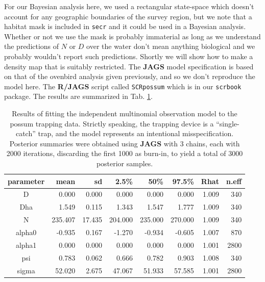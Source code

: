 For our Bayesian analysis here, we used a rectangular state-space which
doesn't account for any geographic boundaries of the survey region, but
we note that a habitat mask is included in {\tt secr} and it could be
used in a Bayesian analysis.
Whether or not we use the mask is
probably immaterial as long as we understand the predictions of $N$ or
$D$ over the water don't mean anything biological and we probably
wouldn't report such predictions. Shortly we will show how to make a
density map that is suitably restricted. The {\bf JAGS} model
specification is based on that of the ovenbird analysis given
previously, and so we don't reproduce the model here. The {\bf R/JAGS}
script called \mbox{\tt SCRpossum} which is in our \mbox{\tt scrbook}
package.
The results are summarized in Tab. \ref{poisson-mn.tab.possum}.



\begin{table}[ht]
\centering
\caption{Results of fitting the independent multinomial observation
  model to the possum trapping data. Strictly speaking, the trapping
  device is a ``single-catch'' trap, and the model represents an intentional
  misspecification.
Posterior summaries were obtained using {\bf JAGS} with
 3 chains, each with 2000 iterations, discarding the first 1000 as
 burn-in, to yield a total of 3000 posterior samples.
}
\begin{tabular}{crrrrrrr} \hline \hline
 parameter & mean &  sd   & 2.5\% & 50\%  & 97.5\% &Rhat& n.eff \\ \hline
D        &  0.000 &  0.000&   0.000 &  0.000 &  0.000 &1.009 &  340\\
Dha      & 1.549  &  0.115&   1.343 &  1.547 &  1.777 &1.009 &  340\\
N        & 235.407&  17.435& 204.000& 235.000& 270.000& 1.009&   340\\
alpha0   &-0.935  &  0.167 & -1.270 & -0.934 &  -0.605& 1.007&   870\\
alpha1   &0.000   & 0.000  & 0.000  & 0.000  &   0.000& 1.001&  2800\\
psi      &0.783   & 0.062  & 0.666  & 0.782  &   0.903& 1.008&   340\\
sigma   &52.020   & 2.675  &47.067  & 51.933 &  57.585& 1.001&  2800
\\ \hline
\end{tabular}
\label{poisson-mn.tab.possum}
\end{table}


